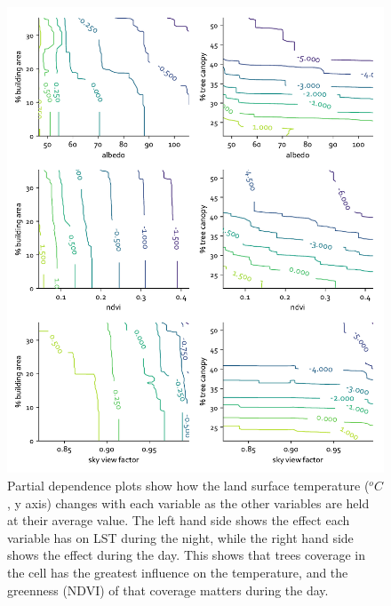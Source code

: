 \documentclass[final,3p,times,twocolumn,sort&compress]{elsarticle}
\begin{document}
\begin{figure}
    \centering
    \includegraphics[width=\linewidth]{fig/report/pdp_2d_night_100.pdf}
    \caption{
    Partial dependence plots show how the land surface temperature ($^oC$, y axis) changes with each variable as the other variables are held at their average value. The left hand side shows the effect each variable has on LST during the night, while the right hand side shows the effect during the day. This shows that trees coverage in the cell has the greatest influence on the temperature, and the greenness (NDVI) of that coverage matters during the day.
    }
    \label{fig:pdp_2dnight}
\end{figure}
\end{document}
